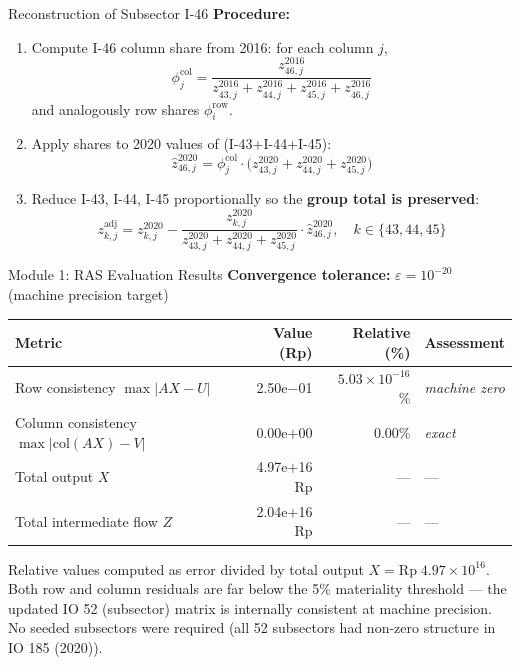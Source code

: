 \documentclass[aspectratio=169]{beamer}
\begin{document}
\begin{frame}{Reconstruction of Subsector I-46}
\textbf{Procedure:}
\begin{enumerate}
  \item Compute I-46 column share from 2016: for each column $j$,
  \[
  \phi_j^{\text{col}} = \frac{z_{46,j}^{2016}}{z_{43,j}^{2016}+z_{44,j}^{2016}+z_{45,j}^{2016}+z_{46,j}^{2016}}
  \]
  and analogously row shares $\phi_i^{\text{row}}$.
  \item Apply shares to 2020 values of (I-43+I-44+I-45):
  \[
  \hat{z}_{46,j}^{2020} = \phi_j^{\text{col}} \cdot \bigl(z_{43,j}^{2020}+z_{44,j}^{2020}+z_{45,j}^{2020}\bigr)
  \]
  \item Reduce I-43, I-44, I-45 proportionally so the \textbf{group total is preserved}:
  \[
  z_{k,j}^{\text{adj}} = z_{k,j}^{2020} - \frac{z_{k,j}^{2020}}{z_{43,j}^{2020}+z_{44,j}^{2020}+z_{45,j}^{2020}} \cdot \hat{z}_{46,j}^{2020}, \quad k \in \{43,44,45\}
  \]
\end{enumerate}
\end{frame}

\begin{frame}{Module 1: RAS Evaluation Results}
\textbf{Convergence tolerance:} $\varepsilon = 10^{-20}$ (machine precision target)

\medskip
\begin{center}
\renewcommand{\arraystretch}{1.3}
\footnotesize
\begin{tabular}{@{}p{5.2cm}rrl@{}}
\toprule
\textbf{Metric} & \textbf{Value (Rp)} & \textbf{Relative (\%)} & \textbf{Assessment} \\
\midrule
Row consistency $\max|AX - U|$              & 2.50e$-$01    & $5.03 \times 10^{-16}$\% & \textit{machine zero} \\
Column consistency $\max|\text{col}(AX)-V|$ & 0.00e$+$00    & 0.00\%                   & \textit{exact} \\
\midrule
Total output $X$            & 4.97e$+$16 Rp & --- & --- \\
Total intermediate flow $Z$ & 2.04e$+$16 Rp & --- & --- \\
\bottomrule
\end{tabular}
\end{center}

\medskip
\small
Relative values computed as error divided by total output $X = \text{Rp}\;4.97 \times 10^{16}$. Both row and column residuals are far below the 5\% materiality threshold --- the updated IO 52 (subsector) matrix is internally consistent at machine precision. No seeded subsectors were required (all 52 subsectors had non-zero structure in IO 185 (2020)).
\end{frame}
\end{document}

